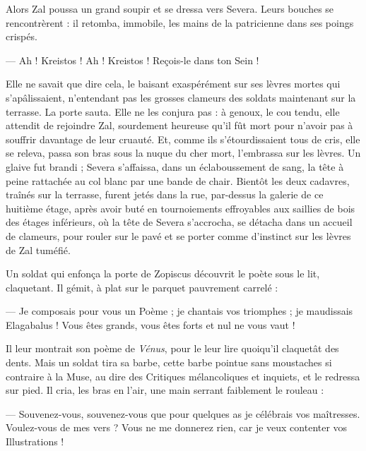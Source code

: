 \documentclass[a4paper, 11pt, oneside, polutonikogreek, french]{article}
\begin{document}
Alors Zal poussa un grand soupir et se dressa vers Severa. Leurs bouches se rencontrèrent : il retomba, immobile, les mains de la patricienne dans ses poings crispés.

--- Ah ! Kreistos ! Ah ! Kreistos ! Reçois-le dans ton Sein !

Elle ne savait que dire cela, le baisant exaspérément sur ses lèvres mortes qui s'apâlissaient, n'entendant pas les grosses clameurs des soldats maintenant sur la terrasse. La porte sauta. Elle ne les conjura pas : à genoux, le cou tendu, elle attendit de rejoindre Zal, sourdement heureuse qu'il fût mort pour n'avoir pas à souffrir davantage de leur cruauté. Et, comme ils s'étourdissaient tous de cris, elle se releva, passa son bras sous la nuque du cher mort, l'embrassa sur les lèvres. Un glaive fut brandi ; Severa s'affaissa, dans un éclaboussement de sang, la tête à peine rattachée au col blanc par une bande de chair. Bientôt les deux cadavres, traînés sur la terrasse, furent jetés dans la rue, par-dessus la galerie de ce huitième étage, après avoir buté en tournoiements effroyables aux saillies de bois des étages inférieurs, où la tête de Severa s'accrocha, se détacha dans un accueil de clameurs, pour rouler sur le pavé et se porter comme d'instinct sur les lèvres de Zal tuméfié.

Un soldat qui enfonça la porte de Zopiscus découvrit le poète sous le lit, claquetant. Il gémit, à plat sur le parquet pauvrement carrelé :

--- Je composais pour vous un Poème ; je chantais vos triomphes ; je maudissais Elagabalus ! Vous êtes grands, vous êtes forts et nul ne vous vaut !

Il leur montrait son poème de \emph{Vénus}, pour le leur lire quoiqu'il claquetât des dents. Mais un soldat tira sa barbe, cette barbe pointue sans moustaches si contraire à la Muse, au dire des Critiques mélancoliques et inquiets, et le redressa sur pied. Il cria, les bras en l'air, une main serrant faiblement le rouleau :

--- Souvenez-vous, souvenez-vous que pour quelques as je célébrais vos maîtresses. Voulez-vous de mes vers ? Vous ne me donnerez rien, car je veux contenter vos Illustrations !
\end{document}
